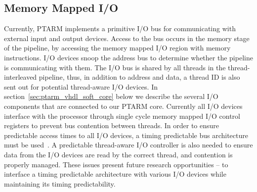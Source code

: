 \subsection{Memory Mapped I/O}
Currently, PTARM implements a primitive I/O bus for communicating with external input and output devices.
Access to the bus occurs in the memory stage of the pipeline, by accessing the memory mapped I/O region with memory instructions.
I/O devices snoop the address bus to determine whether the pipeline is communicating with them.
The I/O bus is shared by all threads in the thread-interleaved pipeline, thus, in addition to address and data, a thread ID is also sent out for potential thread-aware I/O devices. 
In section~\ref{sec:ptarm_vhdl_soft_core} below we describe the several I/O components that are connected to our PTARM core.
Currently all I/O devices interface with the processor through single cycle memory mapped I/O control registers to prevent bus contention between threads.
In order to ensure predictable access times to all I/O devices, a timing predictable bus architecture must be used~\cite{Wilhelm_future_arch_09}.   
A predictable thread-aware I/O controller is also needed to ensure data from the I/O devices are read by the correct thread, and contention is properly managed.
These issues present future research opportunities -- to interface a timing predictable architecture with various I/O devices while maintaining its timing predictability.  

